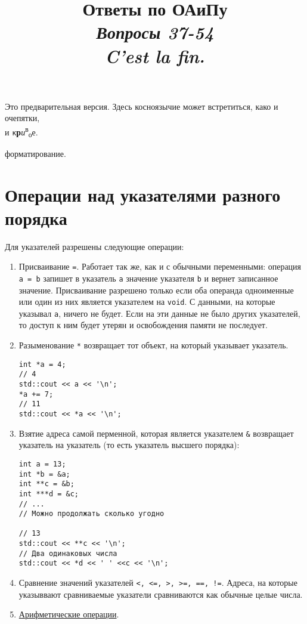 \documentclass[14pt, a4paper]{extarticle}
\begin{document}
\title{Ответы по ОАиПу \\ {\large \textit{Вопросы 37-54 \\ C'est la fin.}}}
\date{}

\clearpage\maketitle
\thispagestyle{empty}
\vspace{6cm}
\begin{center}
  Это предварительная версия. Здесь косноязычие может встретиться, како и очепятки,
  \\
  \hspace*{12cm} и \verb|к|\textbf{р}\textit{и}\textsuperscript{в}\textsubscript{о}е.
\end{center}
форматирование.

\newcommand{\itembf}[1]{\item \textbf{#1}}

\newpage
\tableofcontents
\newpage

\setcounter{section}{36}

\section{Операции над указателями разного порядка}
Для указателей разрешены следующие операции:
\begin{enumerate}
  \item Присваивание \verb|=|. Работает так же, как и с обычными переменными:
  операция \verb|a = b| запишет в указатель \verb|a| значение указателя \verb|b|
  и вернет записанное значение. Присваивание разрешено только если оба операнда одноименные
  или один из них является указателем на \verb|void|. С данными, на которые указывал \verb|a|,
  ничего не будет. Если на эти данные не было других указателей, то доступ к ним будет
  утерян и освобождения памяти не последует.
  \item Разыменование \verb|*| возвращает тот объект, на который указывает указатель.
  \begin{verbatim}
int *a = 4;
// 4
std::cout << a << '\n';
*a += 7;
// 11
std::cout << *a << '\n';
  \end{verbatim}
  \item Взятие адреса самой перменной, которая является указателем \verb|&| возвращает указатель
  на указатель (то есть указатель высшего порядка):
  \begin{verbatim}
int a = 13;
int *b = &a;
int **c = &b;
int ***d = &c;
// ...
// Можно продолжать сколько угодно

// 13
std::cout << **c << '\n';
// Два одинаковых числа
std::cout << *d << ' ' <<c << '\n';
  \end{verbatim}
  \item Сравнение значений указателей \verb|<, <=, >, >=, ==, !=|. Адреса, на которые
  указыввают сравниваемые указатели сравниваются как обычные целые числа.
  \item \hyperref[sec:ptr_arithm]{Арифметические операции}.
\end{enumerate}
\end{document}
